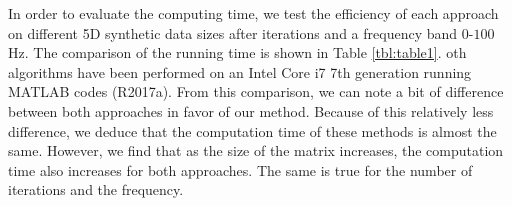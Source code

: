
In order to evaluate the computing time, we test the efficiency of each approach on different 5D synthetic data sizes after  iterations and a frequency band  $0$-$100$ Hz. The comparison of the running time is shown in Table \ref{tbl:table1}. oth algorithms have been performed on an Intel Core i7 7th generation running MATLAB codes (R2017a). From this comparison, we can note a  bit of difference between both approaches in favor of our method. Because of this relatively less difference, we deduce that the computation time of these methods is almost the same. However, we find that as the size of the matrix increases, the computation time also increases for both approaches. The same is true for the number of iterations and the frequency.

